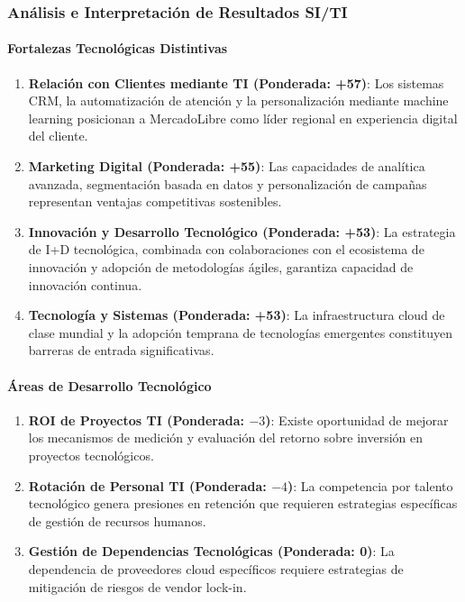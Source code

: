 \subsubsection{Análisis e Interpretación de Resultados SI/TI}

\paragraph{Fortalezas Tecnológicas Distintivas}

\begin{enumerate}
\item \textbf{Relación con Clientes mediante TI (Ponderada: +57)}: Los sistemas CRM, la automatización de atención y la personalización mediante machine learning posicionan a MercadoLibre como líder regional en experiencia digital del cliente.

\item \textbf{Marketing Digital (Ponderada: +55)}: Las capacidades de analítica avanzada, segmentación basada en datos y personalización de campañas representan ventajas competitivas sostenibles.

\item \textbf{Innovación y Desarrollo Tecnológico (Ponderada: +53)}: La estrategia de I+D tecnológica, combinada con colaboraciones con el ecosistema de innovación y adopción de metodologías ágiles, garantiza capacidad de innovación continua.

\item \textbf{Tecnología y Sistemas (Ponderada: +53)}: La infraestructura cloud de clase mundial y la adopción temprana de tecnologías emergentes constituyen barreras de entrada significativas.
\end{enumerate}

\paragraph{Áreas de Desarrollo Tecnológico}

\begin{enumerate}
\item \textbf{ROI de Proyectos TI (Ponderada: $-3$)}: Existe oportunidad de mejorar los mecanismos de medición y evaluación del retorno sobre inversión en proyectos tecnológicos.

\item \textbf{Rotación de Personal TI (Ponderada: $-4$)}: La competencia por talento tecnológico genera presiones en retención que requieren estrategias específicas de gestión de recursos humanos.

\item \textbf{Gestión de Dependencias Tecnológicas (Ponderada: 0)}: La dependencia de proveedores cloud específicos requiere estrategias de mitigación de riesgos de vendor lock-in.
\end{enumerate}

